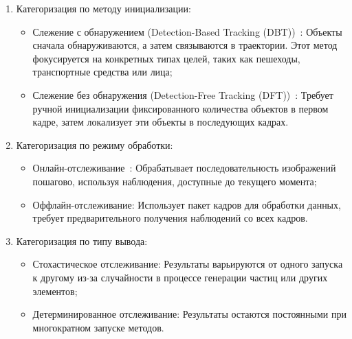 \begin{enumerate}

	\item Категоризация по методу инициализации: 
		
	\begin{itemize}
		
		\item Слежение с обнаружением (Detection-Based Tracking (DBT))~\cite{Bose2007, Song2010}: Объекты сначала обнаруживаются, а затем связываются в траектории. Этот метод фокусируется на конкретных типах целей, таких как пешеходы, транспортные средства или лица;
		
		\item Слежение без обнаружения (Detection-Free Tracking (DFT))~\cite{Zhang2013}: Требует ручной инициализации фиксированного количества объектов в первом кадре, затем локализует эти объекты в последующих кадрах.
	
	\end{itemize}
	
	\item Категоризация по режиму обработки:
	
	\begin{itemize}
		
		\item Онлайн-отслеживание~\cite{Xiang2015}: Обрабатывает последовательность изображений пошагово, используя наблюдения, доступные до текущего момента;
		
		\item Оффлайн-отслеживание: Использует пакет кадров для обработки данных, требует предварительного получения наблюдений со всех кадров.
		
	\end{itemize}
	
	\item Категоризация по типу вывода:
	
	\begin{itemize}
		
		\item Стохастическое отслеживание: Результаты варьируются от одного запуска к другому из-за случайности в процессе генерации частиц или других элементов;
		
		\item Детерминированное отслеживание: Результаты остаются постоянными при многократном запуске методов.
		
	\end{itemize}
	
\end{enumerate}

